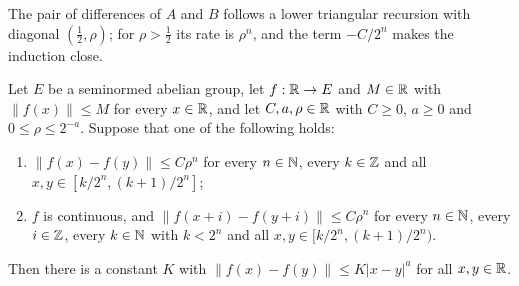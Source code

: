 The pair of differences of $A$ and $B$ follows a lower triangular recursion with diagonal
$(\frac12, \rho)$; for $\rho > \frac12$ its rate is $\rho^n$, and the term $-C/2^n$ makes the
induction close.

\begin{proposition}
\label{prop:daub-holder-from-dyadic}
\leanok
Let $E$ be a seminormed abelian group, let $f : \mathbb{R} \to E$ and $M \in \mathbb{R}$ with
$\|f(x)\| \leq M$ for every $x \in \mathbb{R}$, and let $C, a, \rho \in \mathbb{R}$ with $C \geq 0$, $a \geq 0$
and $0 \leq \rho \leq 2^{-a}$. Suppose that one of the following holds:
\begin{enumerate}
  \item $\|f(x) - f(y)\| \leq C \rho^n$ for every $n \in \mathbb{N}$, every $k \in \mathbb{Z}$ and all
    $x, y \in [k/2^n, (k+1)/2^n]$;
  \item $f$ is continuous, and $\|f(x + i) - f(y + i)\| \leq C \rho^n$ for every $n \in \mathbb{N}$,
    every $i \in \mathbb{Z}$, every $k \in \mathbb{N}$ with $k < 2^n$ and all $x, y \in [k/2^n, (k+1)/2^n)$.
\end{enumerate}
Then there is a constant $K$ with $\|f(x) - f(y)\| \leq K |x - y|^a$ for all $x, y \in \mathbb{R}$.
\end{proposition}

